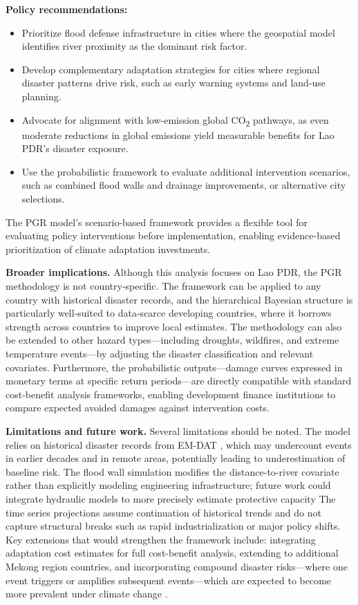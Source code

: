 \documentclass[11pt,a4paper]{article}
\begin{document}
\textbf{Policy recommendations:}
\begin{itemize}[leftmargin=2em]
  \item Prioritize flood defense infrastructure in cities where the geospatial model identifies river proximity as the dominant risk factor.
  \item Develop complementary adaptation strategies for cities where regional disaster patterns drive risk, such as early warning systems and land-use planning.
  \item Advocate for alignment with low-emission global CO\textsubscript{2} pathways, as even moderate reductions in global emissions yield measurable benefits for Lao PDR's disaster exposure.
  \item Use the probabilistic framework to evaluate additional intervention scenarios, such as combined flood walls and drainage improvements, or alternative city selections.
\end{itemize}

The PGR model's scenario-based framework provides a flexible tool for evaluating policy interventions before implementation, enabling evidence-based prioritization of climate adaptation investments.

\textbf{Broader implications.} Although this analysis focuses on Lao PDR, the PGR methodology is not country-specific. The framework can be applied to any country with historical disaster records, and the hierarchical Bayesian structure is particularly well-suited to data-scarce developing countries, where it borrows strength across countries to improve local estimates. The methodology can also be extended to other hazard types---including droughts, wildfires, and extreme temperature events---by adjusting the disaster classification and relevant covariates. Furthermore, the probabilistic outputs---damage curves expressed in monetary terms at specific return periods---are directly compatible with standard cost-benefit analysis frameworks, enabling development finance institutions to compare expected avoided damages against intervention costs.

\textbf{Limitations and future work.} Several limitations should be noted. The model relies on historical disaster records from EM-DAT \cite{emdat2024}, which may undercount events in earlier decades and in remote areas, potentially leading to underestimation of baseline risk. The flood wall simulation modifies the distance-to-river covariate rather than explicitly modeling engineering infrastructure; future work could integrate hydraulic models to more precisely estimate protective capacity The time series projections assume continuation of historical trends and do not capture structural breaks such as rapid industrialization or major policy shifts. Key extensions that would strengthen the framework include: integrating adaptation cost estimates for full cost-benefit analysis, extending to additional Mekong region countries, and incorporating compound disaster risks---where one event triggers or amplifies subsequent events---which are expected to become more prevalent under climate change \cite{ipcc2023ar6}.
\end{document}
